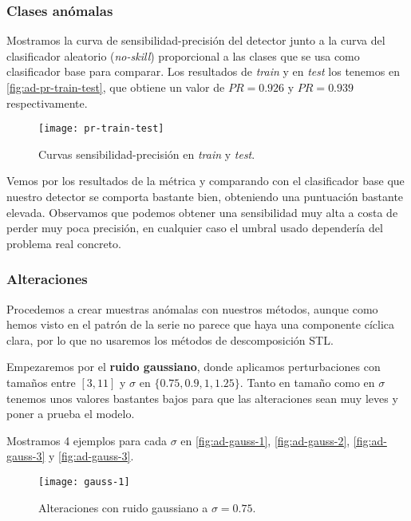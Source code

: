 \subsubsection{Clases anómalas}

Mostramos la curva de sensibilidad-precisión del detector junto a la curva del clasificador aleatorio (\emph{no-skill}) proporcional a las clases que se usa como clasificador base para comparar. Los resultados de \emph{train} y en \emph{test} los tenemos en \autoref{fig:ad-pr-train-test}, que obtiene un valor de $PR = 0.926$ y $PR = 0.939$ respectivamente.

\begin{figure}[htpb]
  \centering
  \texttt{[image: pr-train-test]}
  \caption{Curvas sensibilidad-precisión en \emph{train} y \emph{test}.}
  \label{fig:ad-pr-train-test}
\end{figure}

Vemos por los resultados de la métrica y comparando con el clasificador base que nuestro detector se comporta bastante bien, obteniendo una puntuación bastante elevada. Observamos que podemos obtener una sensibilidad muy alta a costa de perder muy poca precisión, en cualquier caso el umbral usado dependería del problema real concreto.

\subsubsection{Alteraciones}

Procedemos a crear muestras anómalas con nuestros métodos, aunque como hemos visto en el patrón de la serie no parece que haya una componente cíclica clara, por lo que no usaremos los métodos de descomposición STL.

Empezaremos por el \textbf{ruido gaussiano}, donde aplicamos perturbaciones con tamaños entre $[3, 11]$ y $\sigma$ en $\{0.75, 0.9, 1, 1.25\}$. Tanto en tamaño como en $\sigma$ tenemos unos valores bastantes bajos para que las alteraciones sean muy leves y poner a prueba el modelo.

Mostramos 4 ejemplos para cada $\sigma$ en \autoref{fig:ad-gauss-1}, \autoref{fig:ad-gauss-2}, \autoref{fig:ad-gauss-3} y \autoref{fig:ad-gauss-3}.

\begin{figure}[htpb]
  \centering
  \texttt{[image: gauss-1]}
  \caption{Alteraciones con ruido gaussiano a $\sigma = 0.75$.}
  \label{fig:ad-gauss-1}
\end{figure}

